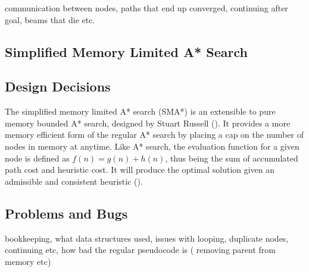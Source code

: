 \documentclass[]{article}
\begin{document}
communication between nodes, paths that end up converged, continuing after goal, beams that die etc.

\pagebreak

\begin{center}
	\section*{Simplified Memory Limited A* Search}
\end{center}

\vspace*{0.8cm}
\subsection*{Design Decisions}

The simplified memory limited A* search (SMA*) is an extensible to pure memory bounded A* search, designed by Stuart Russell (\cite{russell_paper}). It provides a more memory efficient form of the regular A* search by placing a cap on the number of nodes in memory at anytime. Like A* search, the evaluation function for a given node is defined as $f(n)=g(n)+h(n)$, thus being the sum of accumulated path cost and heuristic cost. It will produce the optimal solution given an admissible and consistent heuristic (\cite{norvig}).

\subsection*{Problems and Bugs}

bookkeeping, what data structures used, issues with looping, duplicate nodes, continuing etc, how bad the regular pseudocode is ( removing parent from memory etc)


\break
\setlength{}
\printbibliography[title={References}]

\end{document}
